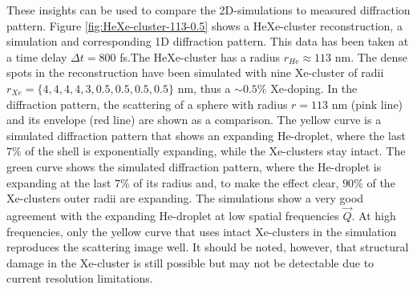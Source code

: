 These insights can be used to compare the 2D-simulations to measured diffraction pattern. Figure \ref{fig:HeXe-cluster-113-0.5} shows a HeXe-cluster reconstruction, a simulation and corresponding 1D diffraction pattern. This data has been taken at a time delay $\Delta t=800$ fs.The HeXe-cluster has a radius $r_{He}\approx 113$ nm. The dense spots in the reconstruction have been simulated with nine Xe-cluster of radii $r_{Xe}=\{4, 4, 4, 4, 3, 0.5, 0.5, 0.5, 0.5\}$ nm, thus a $\sim 0.5 \%$ Xe-doping. In the diffraction pattern, the scattering of a sphere with radius $r=113$ nm (pink line) and its envelope (red line) are shown as a comparison. The yellow curve is a simulated diffraction pattern that shows an expanding He-droplet, where the last $7 \%$ of the shell is exponentially expanding, while the Xe-clusters stay intact. The green curve shows the simulated diffraction pattern, where the He-droplet is expanding at the last $7 \%$ of its radius and, to make the effect clear, $90 \%$ of the Xe-clusters outer radii are expanding. The simulations show a very good agreement with the expanding He-droplet at low spatial frequencies $\vec{Q}$. At high frequencies, only the yellow curve that uses intact Xe-clusters in the simulation reproduces the scattering image well. It should be noted, however, that structural damage in the Xe-cluster is still possible but may not be detectable due to current resolution limitations.
%
%
%
